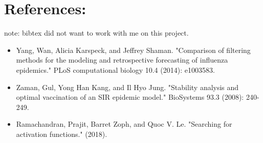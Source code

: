\section{References:}
note: bibtex did not want to work with me on this project.
\begin{itemize}
\item Yang, Wan, Alicia Karspeck, and Jeffrey Shaman. "Comparison of filtering methods for the modeling and retrospective forecasting of influenza epidemics." PLoS computational biology 10.4 (2014): e1003583.

\item Zaman, Gul, Yong Han Kang, and Il Hyo Jung. "Stability analysis and optimal vaccination of an SIR epidemic model." BioSystems 93.3 (2008): 240-249.

\item Ramachandran, Prajit, Barret Zoph, and Quoc V. Le. "Searching for activation functions." (2018).\label{ref:3}

\end{itemize}



%















